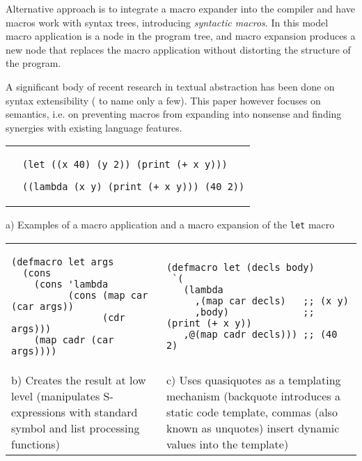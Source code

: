 \documentclass[10pt,journal,a4paper]{IEEEtran}
\begin{document}
Alternative approach is to integrate a macro expander into the compiler and
have macros work with syntax trees, introducing \emph{syntactic macros}.
In this model macro application is a node in the program tree,
and macro expansion produces a new node that replaces the macro application
without distorting the structure of the program.

A significant body of recent research in textual abstraction has been done on syntax
extensibility (\cite{atkinson11, allen09, erdweg11} to name only a few).
This paper however focuses on semantics, i.e. on preventing macros from expanding into nonsense
and finding synergies with existing language features.

\begin{figure*}[t]
\begin{listing}
\normalsize

\begin{tabular}{p{4.0cm} p{15cm}}\\
 &
\begin{verbatim}
(let ((x 40) (y 2)) (print (+ x y)))

((lambda (x y) (print (+ x y))) (40 2))
\end{verbatim}
\end{tabular}

\begin{center}
a) Examples of a macro application and a macro expansion of the \texttt{let} macro
\end{center}

\begin{tabular}{p{8.5cm} p{8.5cm}}\\
\begin{verbatim}
(defmacro let args
  (cons
    (cons 'lambda
          (cons (map car (car args))
                (cdr args)))
    (map cadr (car args))))
\end{verbatim}
&
\begin{verbatim}
(defmacro let (decls body)
 `(
   (lambda
     ,(map car decls)   ;; (x y)
     ,body)             ;; (print (+ x y))
   ,@(map cadr decls))) ;; (40 2)
\end{verbatim}\\
b) Creates the result at low level (manipulates S-expressions
with standard symbol and list processing functions)
&
c) Uses quasiquotes \cite{bawden99} as a templating mechanism
(backquote introduces a static code template, commas (also known as
unquotes) insert dynamic values into the template)
\end{tabular}


\end{listing}
\end{figure*}
\end{document}
